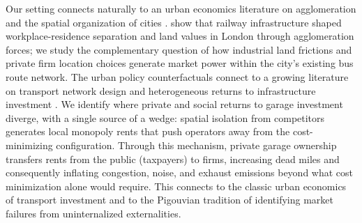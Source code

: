 \documentclass[12pt]{article}
\begin{document}
Our setting connects naturally to an urban economics literature on 
agglomeration and the spatial organization of cities 
\citep[e.g.,][]{combes2015empirics, de2011handbook}. 
\citet{heblich2020making} show that railway infrastructure shaped 
workplace-residence separation and land values in London through 
agglomeration forces; we study the complementary question of how industrial 
land frictions and private firm location choices generate market power 
within the city's existing bus route network. The urban policy 
counterfactuals connect to a growing literature on transport network design 
\citep{fajgelbaum2020optimal, allen2022welfare, balboni2019harm, 
kreindler2024optimal} and heterogeneous returns to infrastructure investment 
\citep{brancaccio2024investment}. We identify where private and social 
returns to garage investment diverge, with a single source of a wedge: 
spatial isolation from competitors generates local monopoly rents that push 
operators away from the cost-minimizing configuration. Through this mechanism, private garage ownership transfers rents from the public (taxpayers) to firms, increasing dead miles and consequently inflating congestion, noise, and exhaust emissions beyond what cost minimization alone would require. This connects to the classic urban 
economics of transport investment \citep{small2024economics} and to the 
Pigouvian tradition \citep{pigou1920economics, laffont1993theory} of 
identifying market failures from uninternalized externalities.
\end{document}
